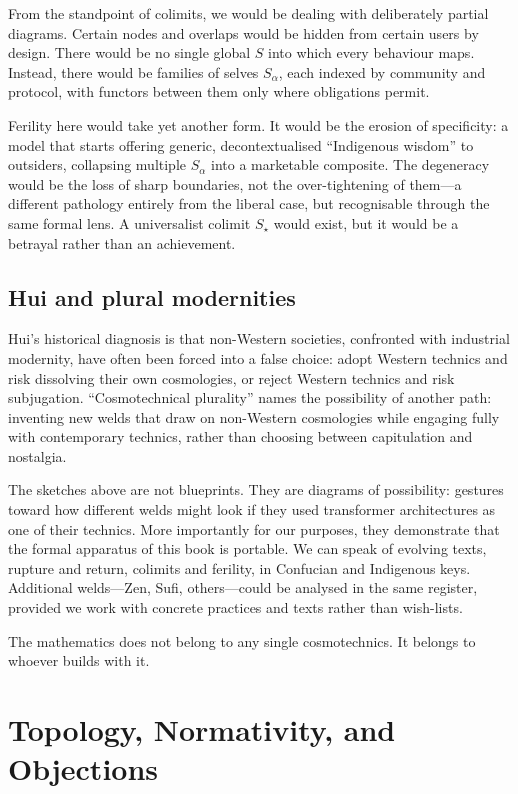 \documentclass[12pt,a4paper]{article}
\begin{document}
From the standpoint of colimits, we would be dealing with deliberately partial diagrams. Certain nodes and overlaps would be hidden from certain users by design. There would be no single global $S$ into which every behaviour maps. Instead, there would be families of selves $S_\alpha$, each indexed by community and protocol, with functors between them only where obligations permit.

Ferility here would take yet another form. It would be the erosion of specificity: a model that starts offering generic, decontextualised ``Indigenous wisdom'' to outsiders, collapsing multiple $S_\alpha$ into a marketable composite. The degeneracy would be the loss of sharp boundaries, not the over-tightening of them---a different pathology entirely from the liberal case, but recognisable through the same formal lens. A universalist colimit $S_\star$ would exist, but it would be a betrayal rather than an achievement.

\subsection*{Hui and plural modernities}

Hui's historical diagnosis is that non-Western societies, confronted with industrial modernity, have often been forced into a false choice: adopt Western technics and risk dissolving their own cosmologies, or reject Western technics and risk subjugation. ``Cosmotechnical plurality'' names the possibility of another path: inventing new welds that draw on non-Western cosmologies while engaging fully with contemporary technics, rather than choosing between capitulation and nostalgia.

The sketches above are not blueprints. They are diagrams of possibility: gestures toward how different welds might look if they used transformer architectures as one of their technics. More importantly for our purposes, they demonstrate that the formal apparatus of this book is portable. We can speak of evolving texts, rupture and return, colimits and ferility, in Confucian and Indigenous keys. Additional welds---Zen, Sufi, others---could be analysed in the same register, provided we work with concrete practices and texts rather than wish-lists.

The mathematics does not belong to any single cosmotechnics. It belongs to whoever builds with it.

\section{Topology, Normativity, and Objections}
\end{document}
